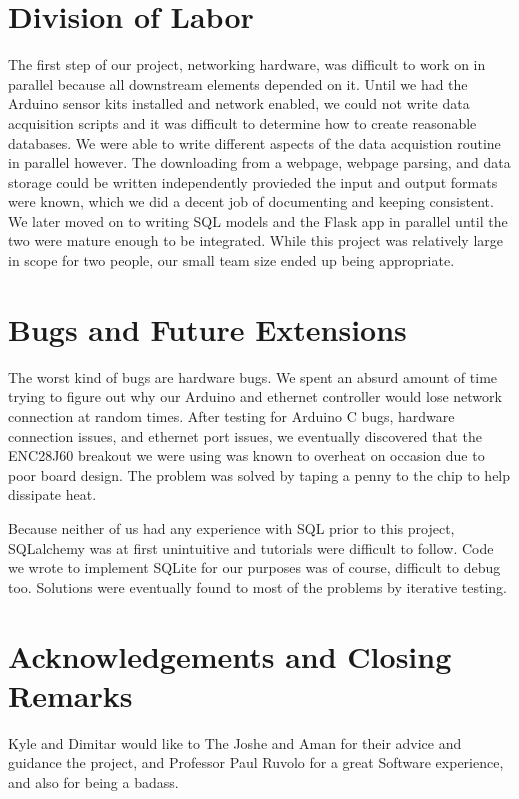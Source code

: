 \documentclass{article}
\begin{document}
\section*{Division of Labor}
\par The first step of our project, networking hardware, was difficult to work on in parallel because all downstream elements depended on it. Until we had the Arduino sensor kits installed and network enabled, we could not write data acquisition scripts and it was difficult to determine how to create reasonable databases. We were able to write different aspects of the data acquistion routine in parallel however. The downloading from a webpage, webpage parsing, and data storage could be written independently provieded the input and output formats were known, which we did a decent job of documenting and keeping consistent. We later moved on to writing SQL models and the Flask app in parallel until the two were mature enough to be integrated. While this project was relatively large in scope for two people, our small team size ended up being appropriate.

\section*{Bugs and Future Extensions}
\par The worst kind of bugs are hardware bugs. We spent an absurd amount of time trying to figure out why our Arduino and ethernet controller would lose network connection at random times. After testing for Arduino C bugs, hardware connection issues, and ethernet port issues, we eventually discovered that the ENC28J60 breakout we were using was known to overheat on occasion due to poor board design. The problem was solved by taping a penny to the chip to help dissipate heat. 

\par Because neither of us had any experience with SQL prior to this project, SQLalchemy was at first unintuitive and tutorials were difficult to follow. Code we wrote to implement SQLite for our purposes was of course, difficult to debug too. Solutions were eventually found to most of the problems by iterative testing.


\section*{Acknowledgements and Closing Remarks}
Kyle and Dimitar would like to The Joshe and Aman for their advice and guidance the project, and Professor Paul Ruvolo for a great Software experience, and also for being a badass.
\end{document}
